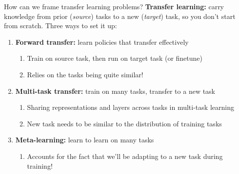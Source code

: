 \begin{frame}{How can we frame transfer learning problems?}
\textbf{Transfer learning:} carry knowledge from prior (\emph{source}) tasks to a new
(\emph{target}) task, so you don't start from scratch. Three ways to set it up:
\vspace{0.4em}
\begin{enumerate}
    \item \textbf{Forward transfer:} learn policies that transfer effectively
    \begin{enumerate}
        \item[a)] Train on source task, then run on target task (or finetune)
        \item[b)] Relies on the tasks being quite similar!
    \end{enumerate}
    \item \textbf{Multi-task transfer:} train on many tasks, transfer to a new task
    \begin{enumerate}
        \item[a)] Sharing representations and layers across tasks in multi-task learning
        \item[b)] New task needs to be similar to the distribution of training tasks
    \end{enumerate}
    \item \textbf{Meta-learning:} learn to learn on many tasks
    \begin{enumerate}
        \item[a)] Accounts for the fact that we'll be adapting to a new task during
                  training!
    \end{enumerate}
\end{enumerate}
\end{frame}

